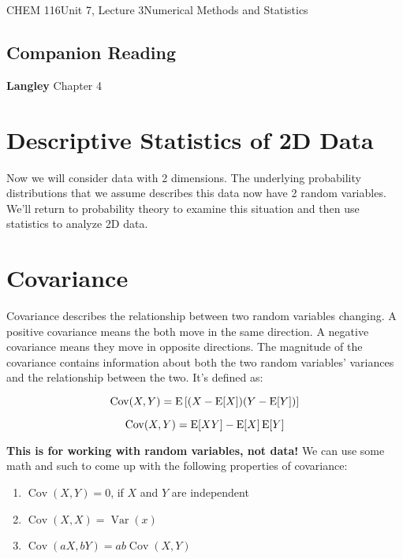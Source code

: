 \documentclass{article}
\DeclareMathOperator{\Var}{Var}
\DeclareMathOperator{\Cov}{Cov}
\begin{document}
\begin{tdoc}{CHEM 116}{Unit 7, Lecture 3}{Numerical Methods and Statistics}

  \subsection*{Companion Reading}
  \textbf{Langley} Chapter 4


\section{Descriptive Statistics of 2D Data}

Now we will consider data with 2 dimensions. The underlying probability distributions that we assume describes this data now have 2 random variables. We'll return to probability theory to examine this situation and then use statistics to analyze 2D data.

\section{Covariance}
Covariance describes the relationship between two random variables
changing. A positive covariance means the both move in the same
direction. A negative covariance means they move in opposite
directions. The magnitude of the covariance contains information about
both the two random variables' variances and the relationship between
the two. It's defined as:

\begin{equation}
  \Cov(X,Y) = \E\left[(X - \E[X])(Y - \E[Y])\right]
\end{equation}

\begin{equation}
  \Cov(X,Y) = \E[XY] - \E[X]\E[Y]
\end{equation}

{\bf This is for working with random variables, not data!} We can use
some math and such to come up with the following properties of covariance:

\begin{enumerate}

\item $\Cov(X,Y) = 0$, if $X$ and $Y$ are independent\\

\item $\Cov(X,X) = \Var(x)$\\

\item $\Cov(aX, bY) = ab\Cov(X,Y)$\\


\end{enumerate}
\end{tdoc}
\end{document}
